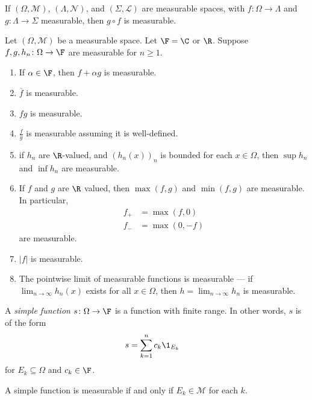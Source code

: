 \begin{fact}
  If $\left(\Omega,\mathcal{M}\right)$, $\left(\Lambda,\mathcal{N}\right)$, and $\left(\Sigma,\mathcal{L}\right)$ are measurable spaces, with $f\colon \Omega\rightarrow \Lambda$ and $g\colon \Lambda\rightarrow \Sigma$ measurable, then $g\circ f$ is measurable.\label{fact:composition}
\end{fact}
\begin{proposition}
  Let $\left(\Omega,\mathcal{M}\right)$ be a measurable space. Let $\F = \C$ or $\R$. Suppose $f,g,h_n\colon \Omega\rightarrow \F$ are measurable for $n\geq 1$.
  \begin{enumerate}[(1)]
    \item If $\alpha \in \F$, then $f + \alpha g$ is measurable.
    \item $\overline{f}$ is measurable.
    \item $fg$ is measurable.
    \item $\frac{f}{g}$ is measurable assuming it is well-defined.
    \item if $h_n$ are $\R$-valued, and $\left(h_n\left(x\right)\right)_n$ is bounded for each $x\in \Omega$, then $\sup h_n$ and $\inf h_n$ are measurable.
    \item If $f$ and $g$ are $\R$ valued, then $\max\left(f,g\right)$ and $\min\left(f,g\right)$ are measurable. In particular,
      \begin{align*}
        f_{+} &= \max\left(f,0\right)\\
        f_{-} &= \max\left(0,-f\right)
      \end{align*}
      are measurable.
    \item $\left\vert f \right\vert$ is measurable.
    \item The pointwise limit of measurable functions is measurable --- if $\lim_{n\rightarrow\infty}h_n\left(x\right)$ exists for all $x\in \Omega$, then $h = \lim_{n\rightarrow\infty}h_n$ is measurable.
  \end{enumerate}
\end{proposition}
\begin{definition}
  A \textit{simple function} $s\colon \Omega\rightarrow \F$ is a function with finite range. In other words, $s$ is of the form
  \begin{align*}
    s &= \sum_{k=1}^{n}c_k\1_{E_k}
  \end{align*}
  for $E_k\subseteq \Omega$ and $c_k\in \F$.
\end{definition}
\begin{fact}
A simple function is measurable if and only if $E_k\in \mathcal{M}$ for each $k$.
\end{fact}
